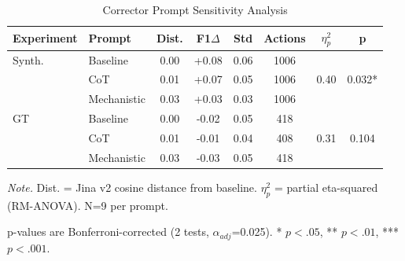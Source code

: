 \begin{table}[H]
\centering
\footnotesize
\caption{Corrector Prompt Sensitivity Analysis}
\label{tab:corrector_sensitivity}
\begin{threeparttable}
\begin{tabular}{@{}llcccccc@{}}
\toprule
\textbf{Experiment} & \textbf{Prompt} & \textbf{Dist.} & \textbf{F1$\Delta$} & \textbf{Std} & \textbf{Actions} & \textbf{$\eta^2_p$} & \textbf{p} \\
\midrule
Synth. & Baseline & 0.00 & +0.08 & 0.06 & 1006 & \multirow{3}{*}{0.40} & \multirow{3}{*}{0.032*} \\
 & CoT & 0.01 & +0.07 & 0.05 & 1006 &  &  \\
 & Mechanistic & 0.03 & +0.03 & 0.03 & 1006 &  &  \\
\midrule
GT & Baseline & 0.00 & -0.02 & 0.05 & 418 & \multirow{3}{*}{0.31} & \multirow{3}{*}{0.104} \\
 & CoT & 0.01 & -0.01 & 0.04 & 408 &  &  \\
 & Mechanistic & 0.03 & -0.03 & 0.05 & 418 &  &  \\
\bottomrule
\end{tabular}
\begin{tablenotes}
\scriptsize
\item \textit{Note.} Dist. = Jina v2 cosine distance from baseline. $\eta^2_p$ = partial eta-squared (RM-ANOVA). N=9 per prompt.
\item p-values are Bonferroni-corrected (2 tests, $\alpha_{adj}$=0.025). * $p<.05$, ** $p<.01$, *** $p<.001$.
\end{tablenotes}
\end{threeparttable}
\end{table}